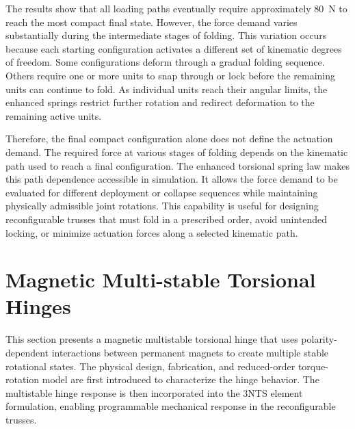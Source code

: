 The results show that all loading paths eventually require approximately 80~N to reach the most compact final state. However, the force demand varies substantially during the intermediate stages of folding. This variation occurs because each starting configuration activates a different set of kinematic degrees of freedom. Some configurations deform through a gradual folding sequence. Others require one or more units to snap through or lock before the remaining units can continue to fold. As individual units reach their angular limits, the enhanced springs restrict further rotation and redirect deformation to the remaining active units.

Therefore, the final compact configuration alone does not define the actuation demand. The required force at various stages of folding depends on the kinematic path used to reach a final configuration. The enhanced torsional spring law makes this path dependence accessible in simulation. It allows the force demand to be evaluated for different deployment or collapse sequences while maintaining physically admissible joint rotations. This capability is useful for designing reconfigurable trusses that must fold in a prescribed order, avoid unintended locking, or minimize actuation forces along a selected kinematic path.
 
\section{Magnetic Multi-stable Torsional Hinges}\label{04-sec-multistable-hinge}
This section presents a magnetic multistable torsional hinge that uses polarity-dependent interactions between permanent magnets to create multiple stable rotational states. The physical design, fabrication, and reduced-order torque-rotation model are first introduced to characterize the hinge behavior. The multistable hinge response is then incorporated into the 3NTS element formulation, enabling programmable mechanical response in the reconfigurable trusses.

